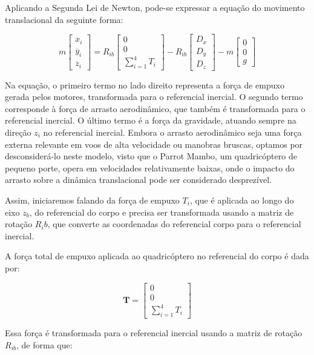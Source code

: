 Aplicando a Segunda Lei de Newton, pode-se expressar a equação do movimento translacional da seguinte forma:

\[
m \begin{bmatrix}
\ddot{x_i} \\
\ddot{y_i} \\
\ddot{z_i}
\end{bmatrix} = R_{ib}
\begin{bmatrix}
0 \\
0 \\
\sum_{i=1}^{4} T_i
\end{bmatrix} - R_{ib}
\begin{bmatrix}
D_x \\
D_y \\
D_z
\end{bmatrix} - m
\begin{bmatrix}
0 \\
0 \\
g
\end{bmatrix}
\]

Na equação, o primeiro termo no lado direito representa a força de empuxo gerada pelos motores, transformada para o referencial inercial. O segundo termo corresponde à força de arrasto aerodinâmico, que também é transformada para o referencial inercial. O último termo é a força da gravidade, atuando sempre na direção $z_i$ no referencial inercial. Embora o arrasto aerodinâmico seja uma força externa relevante em voos de alta velocidade ou manobras bruscas, optamos por desconsiderá-lo neste modelo, visto que o Parrot Mambo, um quadricóptero de pequeno porte, opera em velocidades relativamente baixas, onde o impacto do arrasto sobre a dinâmica translacional pode ser considerado desprezível.

Assim, iniciaremos falando da força de empuxo $T_i$, que é aplicada ao longo do eixo $z_b$, do referencial do corpo e precisa ser transformada usando a matriz de rotação $R_ib$, que converte as coordenadas do referencial corpo para o referencial inercial.

A força total de empuxo aplicada ao quadricóptero no referencial do corpo é dada por:

\[
\mathbf{T} = \begin{bmatrix}
0 \\
0 \\
\sum_{i=1}^{4} T_i
\end{bmatrix}
\]

Essa força é transformada para o referencial inercial usando a matriz de rotação $R_{ib}$, de forma que:

